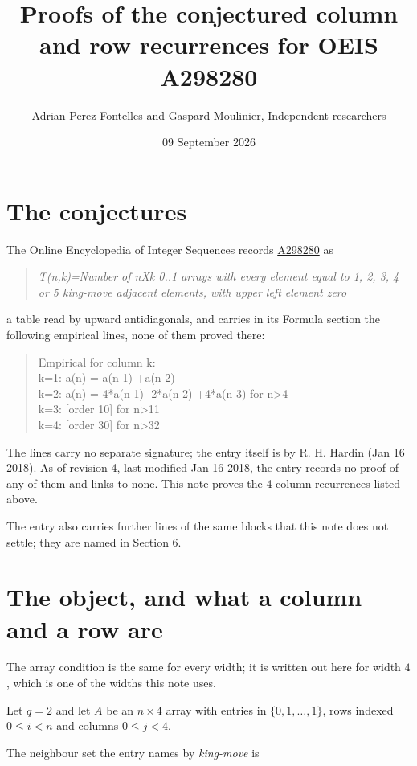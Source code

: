 \documentclass[11pt]{article}
\title{Proofs of the conjectured column and row recurrences for OEIS A298280}
\author{Adrian Perez Fontelles and Gaspard Moulinier, Independent researchers}
\date{09 September 2026}
\theoremstyle{definition}
\begin{document}
\maketitle
\section{The conjectures}

The Online Encyclopedia of Integer Sequences records \href{https://oeis.org/A298280}{A298280} as

\begin{quote}\itshape T(n,k)=Number of nXk 0..1 arrays with every element equal to 1, 2, 3, 4 or 5 king-move adjacent elements, with upper left element zero\end{quote}

a table read by upward antidiagonals, and carries in its Formula section the following empirical lines, none of them proved there:

\begin{quote}\ttfamily Empirical for column k:\\
k=1: a(n) = a(n-1) +a(n-2)\\k=2: a(n) = 4*a(n-1) -2*a(n-2) +4*a(n-3) for n>4\\k=3: [order 10] for n>11\\k=4: [order 30] for n>32\end{quote}

The lines carry no separate signature; the entry itself is by R. H. Hardin (Jan 16 2018). As of revision 4, last modified Jan 16 2018, the entry records no proof of any of them and links to none. This note proves the 4 column recurrences listed above.

The entry also carries further lines of the same blocks that this note does not settle; they are named in Section 6.

\section{The object, and what a column and a row are}

The array condition is the same for every width; it is written out here for width $4$, which is one of the widths this note uses.

Let $q = 2$ and let $A$ be an $n \times 4$ array with entries in $\{0,1,\dots,1\}$, rows indexed $0 \le i < n$ and columns $0 \le j < 4$.

The neighbour set the entry names by {\itshape king-move} is
\end{document}
